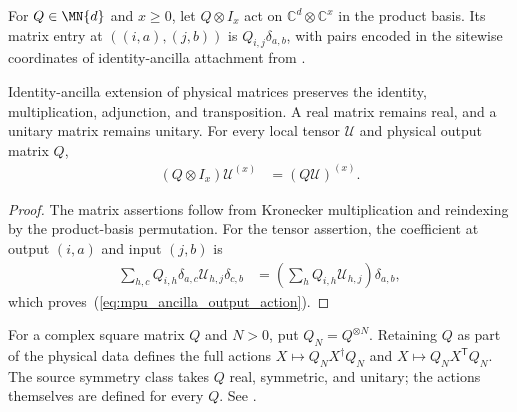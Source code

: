 \begin{definition}
    \label{def:mpu_physical_identity_matrix}
    \leanok
    For $Q\in\MN{d}$ and $x\geq0$, let $Q\otimes I_x$ act on
    $\mathbb C^d\otimes\mathbb C^x$ in the product basis. Its matrix entry
    at $((i,a),(j,b))$ is $Q_{i,j}\delta_{a,b}$, with pairs encoded in the
    sitewise coordinates of identity-ancilla attachment from
    \cite[lines~706--724]{Cirac2017MPU}.
\end{definition}

\begin{lemma}
    \label{lem:mpu_ancilla_output_action}
    \leanok
    Identity-ancilla extension of physical matrices preserves the identity,
    multiplication, adjunction, and transposition. A real matrix remains
    real, and a unitary matrix remains unitary. For every local tensor
    $\mathcal U$ and physical output matrix $Q$,
    \begin{align}
        (Q\otimes I_x)\mathcal U^{(x)}
         & =(Q\mathcal U)^{(x)}.
        \label{eq:mpu_ancilla_output_action}
    \end{align}
\end{lemma}

\begin{proof}\leanok
    The matrix assertions follow from Kronecker multiplication and
    reindexing by the product-basis permutation. For the tensor assertion,
    the coefficient at output $(i,a)$ and input $(j,b)$ is
    \begin{align}
        \sum_{h,c}Q_{i,h}\delta_{a,c}\mathcal U_{h,j}\delta_{c,b}
         & =\left(\sum_hQ_{i,h}\mathcal U_{h,j}\right)\delta_{a,b},
    \end{align}
    which proves~(\ref{eq:mpu_ancilla_output_action}).
\end{proof}

\begin{definition}
    \label{def:mpu_distinguished_physical_matrix_actions}
    \leanok
    For a complex square matrix $Q$ and $N>0$, put $Q_N=Q^{\otimes N}$.
    Retaining $Q$ as part of the physical data defines the full actions
    $X\mapsto Q_NX^\dagger Q_N$ and $X\mapsto Q_NX^{\mathsf T}Q_N$.
    The source symmetry class takes $Q$ real, symmetric, and unitary;
    the actions themselves are defined for every $Q$.
    See \cite[lines~1301--1322]{Cirac2017MPU}.
\end{definition}

